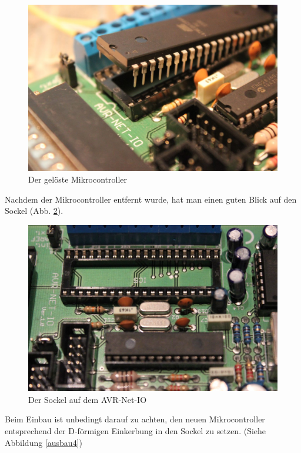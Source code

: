 \begin{figure}[H]
\centering
\includegraphics[width=13cm]{content/pictures/Anleitung/tauscheProzessor/2_Geloest.jpg}
\caption{Der gelöste Mikrocontroller}
\label{ausbau2}
\end{figure}

Nachdem der Mikrocontroller entfernt wurde, hat man einen guten Blick auf den
Sockel (Abb. \ref{ausbau3}).

\begin{figure}[H]
\centering
\includegraphics[width=13cm]{content/pictures/Anleitung/tauscheProzessor/3_Sockel.jpg}
\caption{Der Sockel auf dem AVR-Net-IO}
\label{ausbau3}
\end{figure}

Beim Einbau ist unbedingt darauf zu achten, den neuen Mikrocontroller entsprechend
der D-förmigen Einkerbung in den Sockel zu setzen. (Siehe Abbildung \ref{ausbau4})


